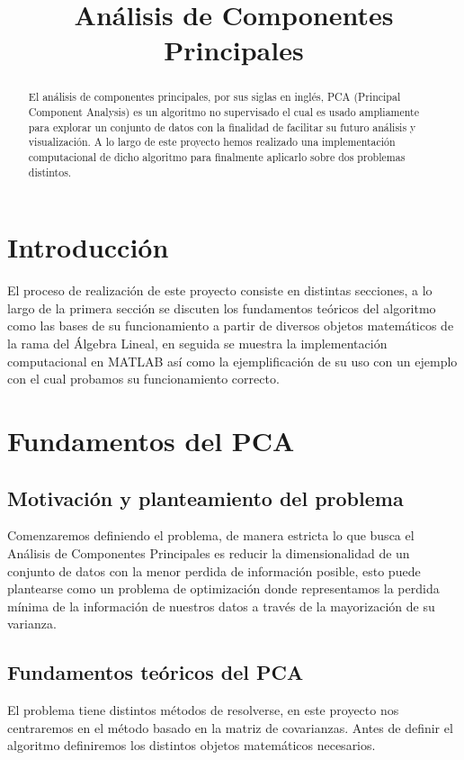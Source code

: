 \documentclass{article}
\title{Análisis de Componentes Principales}
\begin{document}
\maketitle
\begin{abstract}
El análisis de componentes principales, por sus siglas en inglés, PCA (Principal Component Analysis) es un algoritmo no supervisado el cual es usado ampliamente para explorar un conjunto de datos con la finalidad de facilitar su futuro análisis y visualización. A lo largo de este proyecto hemos realizado una implementación computacional de dicho algoritmo para finalmente aplicarlo sobre dos problemas distintos.
\end{abstract}
\section{Introducción}
El proceso de realización de este proyecto consiste en distintas secciones, a lo largo de la primera sección se discuten los fundamentos teóricos del algoritmo como las bases de su funcionamiento a partir de diversos objetos matemáticos de la rama del Álgebra Lineal, en seguida se muestra la implementación computacional en MATLAB así como la ejemplificación de su uso con un ejemplo con el cual probamos su funcionamiento correcto.
\section{Fundamentos del PCA}
\subsection{Motivación y planteamiento del problema}
Comenzaremos definiendo el problema, de manera estricta lo que busca el Análisis de Componentes Principales es reducir la dimensionalidad de un conjunto de datos con la menor perdida de información posible, esto puede plantearse como un problema de optimización donde representamos la perdida mínima de la información de nuestros datos a través de la mayorización de su varianza. 
\subsection{Fundamentos teóricos del PCA}
El problema tiene distintos métodos de resolverse, en este proyecto nos centraremos en el método basado en la matriz de covarianzas.
Antes de definir el algoritmo definiremos los distintos objetos matemáticos necesarios.
\end{document}
